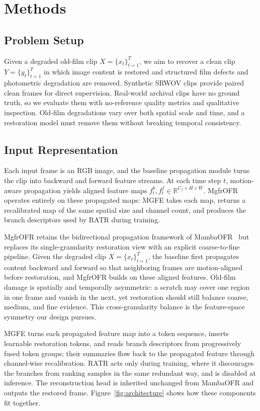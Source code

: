 \section{Methods}
\label{sec:method}

\subsection{Problem Setup}
\label{subsec:problem_setup}

Given a degraded old-film clip $X=\{x_t\}_{t=1}^{T}$, we aim to recover a clean clip $Y=\{y_t\}_{t=1}^{T}$ in which image content is restored and structured film defects and photometric degradation are removed. Synthetic SRWOV clips provide paired clean frames for direct supervision. Real-world archival clips have no ground truth, so we evaluate them with no-reference quality metrics and qualitative inspection. Old-film degradations vary over both spatial scale and time, and a restoration model must remove them without breaking temporal consistency.

\subsection{Input Representation}
\label{subsec:input_representation}

Each input frame is an RGB image, and the baseline propagation module turns the clip into backward and forward feature streams. At each time step $t$, motion-aware propagation yields aligned feature maps $f_t^{b}, f_t^{f} \in \mathbb{R}^{C_f \times H \times W}$. MgfrOFR operates entirely on these propagated maps: MGFE takes each map, returns a recalibrated map of the same spatial size and channel count, and produces the branch descriptors used by RATR during training.

MgfrOFR retains the bidirectional propagation framework of MambaOFR~\cite{mao2025mambaofr} but replaces its single-granularity restoration view with an explicit coarse-to-fine pipeline. Given the degraded clip $X=\{x_t\}_{t=1}^{T}$, the baseline first propagates content backward and forward so that neighboring frames are motion-aligned before restoration, and MgfrOFR builds on these aligned features. Old-film damage is spatially and temporally asymmetric: a scratch may cover one region in one frame and vanish in the next, yet restoration should still balance coarse, medium, and fine evidence. This cross-granularity balance is the feature-space symmetry our design pursues.

MGFE turns each propagated feature map into a token sequence, inserts learnable restoration tokens, and reads branch descriptors from progressively fused token groups; their summaries flow back to the propagated feature through channel-wise recalibration. RATR acts only during training, where it discourages the branches from ranking samples in the same redundant way, and is disabled at inference. The reconstruction head is inherited unchanged from MambaOFR and outputs the restored frame. Figure~\ref{fig:architecture} shows how these components fit together.

